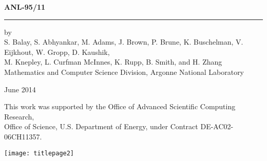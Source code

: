 \documentclass[twoside,11pt]{../sty/report_petsc}
\begin{document}



\hfill {\large{\bf ANL-95/11}}

\vspace*{3in}
\vspace*{8pt}
\hrule
\vspace*{8pt}

\vspace*{1in}
\noindent by \\
S. Balay, S. Abhyankar, M. Adams, J. Brown, P. Brune, K. Buschelman, V. Eijkhout, W. Gropp, D. Kaushik, \\
M. Knepley, L. Curfman McInnes, K. Rupp, B. Smith, and H. Zhang \\
Mathematics and Computer Science Division, Argonne National Laboratory

\vspace*{10pt}
\noindent June 2014

\vspace*{20pt}
\noindent This work was supported by the Office of Advanced Scientific Computing Research, \\
Office of Science, U.S. Department of Energy, under Contract DE-AC02-06CH11357.


\begin{figure*}[hbt]
\centerline{\texttt{[image: titlepage2]}}
\caption{}
\end{figure*}


\cleardoublepage

\vspace{1in}
\date{\today}



\cleardoublepage



\medskip \medskip
\end{document}
